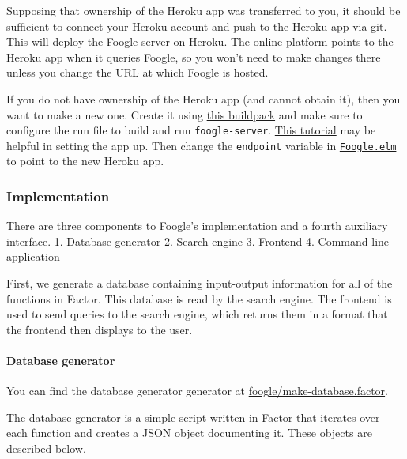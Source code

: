 \documentclass[
]{article}
\begin{document}
Supposing that
ownership of the Heroku app was transferred to you, it should be
sufficient to connect your Heroku account and
\href{https://devcenter.heroku.com/articles/git}{push to the Heroku app
via git}. This will deploy the Foogle server on Heroku. The online
platform points to the Heroku app when it queries Foogle, so you won't
need to make changes there unless you change the URL at which Foogle is
hosted.

If you do not have ownership of the Heroku app (and cannot obtain it),
then you want to make a new one. Create it using
\href{https://github.com/mfine/heroku-buildpack-stack}{this buildpack}
and make sure to configure the run file to build and run
\texttt{foogle-server}.
\href{https://hackernoon.com/for-all-the-world-to-see-deploying-haskell-with-heroku-7ea46f827ce}{This
tutorial} may be helpful in setting the app up. Then change the
\texttt{endpoint} variable in
\href{https://github.com/factor-hmc/simple-interpreter/blob/master/src/Foogle.elm}{\texttt{Foogle.elm}}
to point to the new Heroku app.

\hypertarget{implementation}{%
\subsubsection{Implementation}\label{implementation}}

There are three components to Foogle's implementation and a fourth
auxiliary interface. 1. Database generator 2. Search engine 3. Frontend
4. Command-line application

First, we generate a database containing input-output information for
all of the functions in Factor. This database is read by the search
engine. The frontend is used to send queries to the search engine, which
returns them in a format that the frontend then displays to the user.

\hypertarget{database-generator}{%
\paragraph{Database generator}\label{database-generator}}

You can find the database generator generator at
\href{https://github.com/factor-hmc/foogle/blob/master/make-database.factor}{foogle/make-database.factor}.

The database generator is a simple script written in Factor that
iterates over each function and creates a JSON object documenting it.
These objects are described below.
\end{document}
